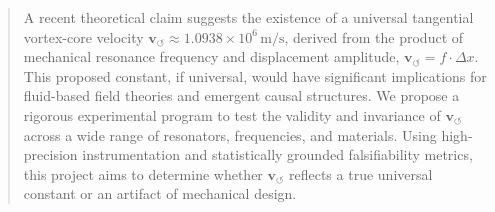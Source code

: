 \documentclass[11pt]{article}
\begin{document}
    \titlepageOpen

    \begin{abstract}
        A recent theoretical claim suggests the existence of a universal tangential vortex-core velocity \( \mathbf{v}_{\scriptscriptstyle\boldsymbol{\circlearrowleft}} \approx 1.0938 \times 10^6 \, \text{m/s} \), derived from the product of mechanical resonance frequency and displacement amplitude, \( \mathbf{v}_{\scriptscriptstyle\boldsymbol{\circlearrowleft}} = f \cdot \Delta x \). This proposed constant, if universal, would have significant implications for fluid-based field theories and emergent causal structures. We propose a rigorous experimental program to test the validity and invariance of \( \mathbf{v}_{\scriptscriptstyle\boldsymbol{\circlearrowleft}} \) across a wide range of resonators, frequencies, and materials. Using high-precision instrumentation and statistically grounded falsifiability metrics, this project aims to determine whether \( \mathbf{v}_{\scriptscriptstyle\boldsymbol{\circlearrowleft}} \) reflects a true universal constant or an artifact of mechanical design.

    \end{abstract}

    \titlepageClose
    \fi
\end{document}
